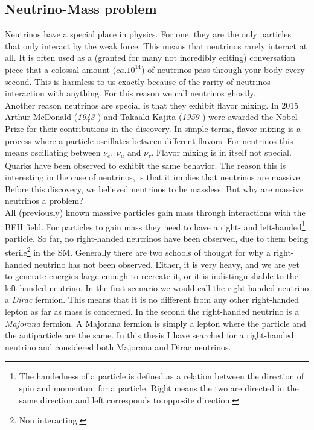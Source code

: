 \subsection{Neutrino-Mass problem}
Neutrinos have a special place in physics. For one, they are the only particles that
only interact by the weak force. This means that neutrinos rarely interact at all. It is often used
as a (granted for many not incredibly eciting) conversation piece that a colossal amount ($ca.10^{14}$) of 
neutrinos pass through your body every second. This is harmless to us exactly because of the rarity
of neutrinos interaction with anything. For this reason we call neutrinos ghostly. 
\\
Another reason neutrinos are special is that they exhibit flavor mixing. In 2015 Arthur McDonald (\emph{1943-}) and 
Takaaki Kajita (\emph{1959-}) were awarded the Nobel Prize for their contributions in the discovery. In simple terms,
flavor mixing is a process where a particle oscillates between different flavors. For neutrinos this 
means oscillating between $\nu_e,\ \nu_\mu$ and $\nu_\tau$. Flavor mixing is in itself not special.
Quarks have been observed to exhibit the same behavior. The reason this is interesting in the case of 
neutrinos, is that it implies that neutrinos are massive. Before this discovery, we believed neutrinos to be
massless. But why are massive neutrinos a problem?
\\
All (previously) known massive particles gain mass through interactions with the \ac{BEH} field. For particles
to gain mass they need to have a right- and left-handed\footnote{The handedness of a particle is defined
as a relation between the direction of spin and momentum for a particle. Right means the two are directed
in the same direction and left corresponds to opposite direction.} particle. So far, no right-handed neutrinos
have been observed, due to them being sterile\footnote{Non interacting.} in the \ac{SM}. Generally there are two schools of thought for why a right-handed neutrino has not been 
observed. Either, it is very heavy, and we are yet to generate energies large enough to recreate it, or 
it is indistinguishable to the left-handed neutrino. In the first scenario we would call the right-handed 
neutrino a \emph{Dirac} fermion. This means that it is no different from any other right-handed lepton as far as mass is concerned. 
In the second the right-handed neutrino is a \emph{Majorana} fermion. A Majorana fermion is simply a lepton where the particle
and the antiparticle are the same. In this thesis I have searched for a right-handed neutrino and considered
both Majorana and Dirac neutrinos.
